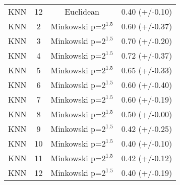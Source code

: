 \documentclass{article}
\begin{document}
\begin{tabular}{cccc}
              KNN &         12 &              Euclidean &  0.40 (+/-0.10) \\
              KNN &          2 &  Minkowski p=$2^{1.5}$ &  0.60 (+/-0.37) \\
              KNN &          3 &  Minkowski p=$2^{1.5}$ &  0.70 (+/-0.20) \\
              KNN &          4 &  Minkowski p=$2^{1.5}$ &  0.72 (+/-0.37) \\
              KNN &          5 &  Minkowski p=$2^{1.5}$ &  0.65 (+/-0.33) \\
              KNN &          6 &  Minkowski p=$2^{1.5}$ &  0.60 (+/-0.40) \\
              KNN &          7 &  Minkowski p=$2^{1.5}$ &  0.60 (+/-0.19) \\
              KNN &          8 &  Minkowski p=$2^{1.5}$ &  0.50 (+/-0.00) \\
              KNN &          9 &  Minkowski p=$2^{1.5}$ &  0.42 (+/-0.25) \\
              KNN &         10 &  Minkowski p=$2^{1.5}$ &  0.40 (+/-0.10) \\
              KNN &         11 &  Minkowski p=$2^{1.5}$ &  0.42 (+/-0.12) \\
              KNN &         12 &  Minkowski p=$2^{1.5}$ &  0.40 (+/-0.19) \\
              \bottomrule
            \end{tabular}
\end{document}
